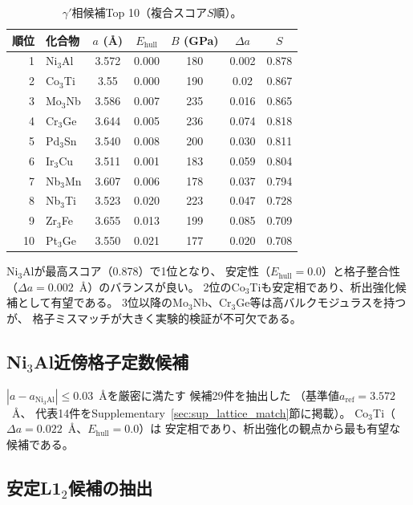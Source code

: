 \documentclass[5p,twocolumn]{elsarticle}
\begin{document}
\begin{table}[t]
  \centering
  \caption{$\gamma'$相候補Top 10（複合スコア$S$順）。}
  \label{tab:gamma_prime}
  \small
  \begin{tabular}{rlccccc}
    \toprule
    順位 & 化合物 & $a$ (\AA) & $E_\text{hull}$ & $B$ (GPa) & $\Delta a$ & $S$ \\
    \midrule
    1 & Ni$_3$Al & 3.572 & 0.000 & 180 & 0.002 & 0.878 \\
    2 & Co$_3$Ti & 3.55 & 0.000 & 190 & 0.02 & 0.867 \\
    3 & Mo$_3$Nb & 3.586 & 0.007 & 235 & 0.016 & 0.865 \\
    4 & Cr$_3$Ge & 3.644 & 0.005 & 236 & 0.074 & 0.818 \\
    5 & Pd$_3$Sn & 3.540 & 0.008 & 200 & 0.030 & 0.811 \\
    6 & Ir$_3$Cu & 3.511 & 0.001 & 183 & 0.059 & 0.804 \\
    7 & Nb$_3$Mn & 3.607 & 0.006 & 178 & 0.037 & 0.794 \\
    8 & Nb$_3$Ti & 3.523 & 0.020 & 223 & 0.047 & 0.728 \\
    9 & Zr$_3$Fe & 3.655 & 0.013 & 199 & 0.085 & 0.709 \\
    10 & Pt$_3$Ge & 3.550 & 0.021 & 177 & 0.020 & 0.708 \\
    \bottomrule
  \end{tabular}
\end{table}

Ni$_3$Alが最高スコア（0.878）で1位となり、
安定性（$E_\text{hull} = 0.0$）と格子整合性
（$\Delta a = 0.002$~\AA）のバランスが良い。
2位のCo$_3$Tiも安定相であり、析出強化候補として有望である。
3位以降のMo$_3$Nb、Cr$_3$Ge等は高バルクモジュラスを持つが、
格子ミスマッチが大きく実験的検証が不可欠である。

\subsection{Ni$_3$Al近傍格子定数候補}
\label{sec:ni3al_lattice}

$|a - a_{\text{Ni}_3\text{Al}}| \leq 0.03$~\AA を厳密に満たす
候補29件を抽出した
（基準値$a_{\text{ref}} = 3.572$~\AA、
代表14件をSupplementary~\ref{sec:sup_lattice_match}節に掲載）。
Co$_3$Ti（$\Delta a = 0.022$~\AA、$E_\text{hull} = 0.0$）は
安定相であり、析出強化の観点から最も有望な候補である。

\subsection{安定L1$_2$候補の抽出}
\label{sec:stable_l12}
\end{document}
